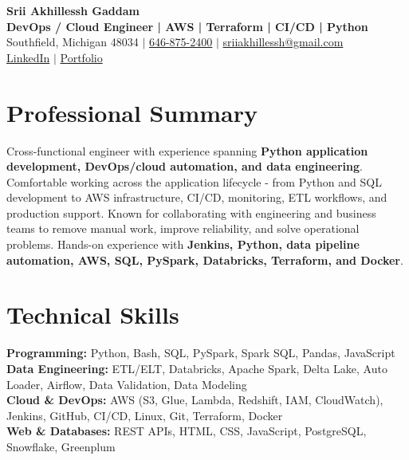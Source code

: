 \documentclass[letterpaper,10pt]{article}
\begin{document}
\fontsize{9.35pt}{10.45pt}\selectfont

\begin{center}
    {\LARGE \textbf{Srii Akhillessh Gaddam}} \\[-1pt]
    \textbf{DevOps / Cloud Engineer | AWS | Terraform | CI/CD | Python} \\[2pt]
    Southfield, Michigan 48034 $|$
    \href{tel:6468752400}{646-875-2400} $|$
    \href{mailto:sriiakhillessh@gmail.com}{sriiakhillessh@gmail.com} \\[1pt]
    \href{https://www.linkedin.com/in/srii-akhiilessh-gaddam-b48668191/}{LinkedIn} $|$
    \href{https://sriiakhillesshg.github.io/portfolio/}{Portfolio}
\end{center}
\vspace{-8pt}

\section{Professional Summary}
\small{Cross-functional engineer with experience spanning \textbf{Python application development, DevOps/cloud automation, and data engineering}. Comfortable working across the application lifecycle - from Python and SQL development to AWS infrastructure, CI/CD, monitoring, ETL workflows, and production support. Known for collaborating with engineering and business teams to remove manual work, improve reliability, and solve operational problems. Hands-on experience with \textbf{Jenkins, Python, data pipeline automation, AWS, SQL, PySpark, Databricks, Terraform, and Docker}.}

\section{Technical Skills}
\small{
\textbf{Programming:} Python, Bash, SQL, PySpark, Spark SQL, Pandas, JavaScript \\
\textbf{Data Engineering:} ETL/ELT, Databricks, Apache Spark, Delta Lake, Auto Loader, Airflow, Data Validation, Data Modeling \\
\textbf{Cloud \& DevOps:} AWS (S3, Glue, Lambda, Redshift, IAM, CloudWatch), Jenkins, GitHub, CI/CD, Linux, Git, Terraform, Docker \\
\textbf{Web \& Databases:} REST APIs, HTML, CSS, JavaScript, PostgreSQL, Snowflake, Greenplum
}
\end{document}
